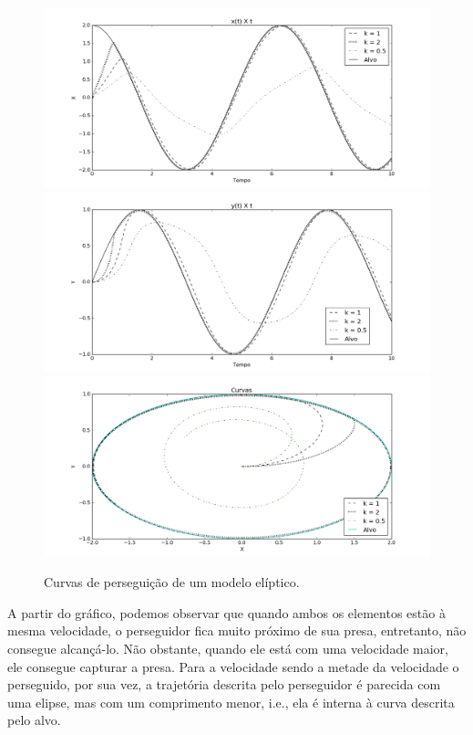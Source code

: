 \documentclass[a4paper,10pt]{article}
\begin{document}
  \begin{figure}[H]
   \includegraphics[width=\textwidth]{el-0-X.png}
   \includegraphics[width=\textwidth]{el-0-Y.png}
   \includegraphics[width=\textwidth]{el-0-XY.png}
   \caption{Curvas de perseguição de um modelo elíptico.}
   \label{fig:curva-el}
  \end{figure}
  
  A partir do gráfico, podemos observar que quando ambos os elementos estão à mesma velocidade, o perseguidor fica muito próximo de sua presa, entretanto, não consegue alcançá-lo. Não obstante, quando ele está com uma velocidade maior, ele consegue capturar a presa. Para a velocidade sendo a metade da velocidade o perseguido, por sua vez, a trajetória descrita pelo perseguidor é parecida com uma elipse, mas com um comprimento menor, i.e., ela é interna à curva descrita pelo alvo.
  
\end{document}
